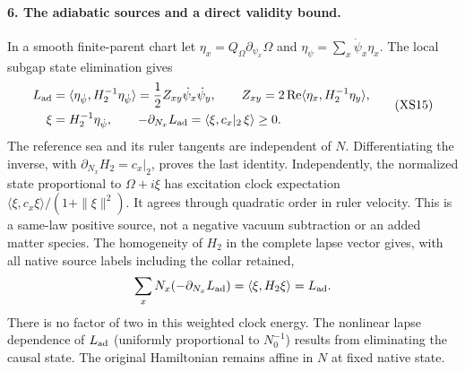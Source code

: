 \documentclass[11pt]{article}
\begin{document}
\paragraph{6. The adiabatic sources and a direct validity bound.}
In a smooth finite-parent chart let
$\eta_x=Q_\Omega\partial_{\psi_x}\Omega$ and
$\eta_{\dot\psi}=\sum_x\dot\psi_x\eta_x$.
The local subgap state elimination gives
\begin{equation}
 \begin{aligned}
 L_{\rm ad}&=\langle\eta_{\dot\psi},
                          H_2^{-1}\eta_{\dot\psi}\rangle
      =\frac12Z_{xy}\dot\psi_x\dot\psi_y,\qquad
 Z_{xy}=2\operatorname{Re}\langle\eta_x,H_2^{-1}\eta_y\rangle,\\
 \xi&=H_2^{-1}\eta_{\dot\psi},\qquad
 -\partial_{N_x}L_{\rm ad}
       =\langle\xi,c_x|_2\,\xi\rangle\geq0 .
 \end{aligned}\tag{XS15}
\end{equation}
The reference sea and its ruler tangents are independent
of $N$.  Differentiating the inverse, with
$\partial_{N_x}H_2=c_x|_2$, proves the last identity.
Independently, the normalized state proportional to
$\Omega+i\xi$ has excitation clock expectation
$\langle\xi,c_x\xi\rangle/(1+\|\xi\|^2)$.
It agrees through quadratic order in ruler velocity.
This is a same-law positive source, not a negative vacuum
subtraction or an added matter species.
The homogeneity of $H_2$ in the complete lapse vector gives,
with all native source labels including the collar retained,
\[
 \sum_xN_x(-\partial_{N_x}L_{\rm ad})
     =\langle\xi,H_2\xi\rangle=L_{\rm ad}.
\]
There is no factor of two in this weighted clock energy.
The nonlinear lapse dependence of $L_{\rm ad}$ (uniformly
proportional to $N_0^{-1}$) results from eliminating the
causal state.  The original Hamiltonian remains affine in
$N$ at fixed native state.
\end{document}
